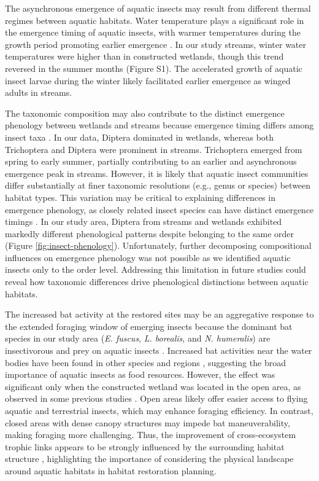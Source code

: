 \documentclass[11pt, class=article, crop=false]{standalone}
\begin{document}
The asynchronous emergence of aquatic insects may result from different thermal regimes between aquatic habitats.
Water temperature plays a significant role in the emergence timing of aquatic insects, with warmer temperatures during the growth period promoting earlier emergence \citep{woods_phenology_2022}.
In our study streams, winter water temperatures were higher than in constructed wetlands, though this trend reversed in the summer months (Figure S1).
The accelerated growth of aquatic insect larvae during the winter likely facilitated earlier emergence as winged adults in streams.

The taxonomic composition may also contribute to the distinct emergence phenology between wetlands and streams because emergence timing differs among insect taxa \citep{terui_species-specific_2017, moore_spawning_2010}.
In our data, Diptera dominated in wetlands, whereas both Trichoptera and Diptera were prominent in streams.
Trichoptera emerged from spring to early summer, partially contributing to an earlier and asynchronous emergence peak in streams.
However, it is likely that aquatic insect communities differ substantially at finer taxonomic resolutions (e.g., genus or species) between habitat types.
This variation may be critical to explaining differences in emergence phenology, as closely related insect species can have distinct emergence timings \citep{moore_spawning_2010}.
In our study area, Diptera from streams and wetlands exhibited markedly different phenological patterns despite belonging to the same order (Figure \ref{fig:insect-phenology}).
Unfortunately, further decomposing compositional influences on emergence phenology was not possible as we identified aquatic insects only to the order level.
Addressing this limitation in future studies could reveal how taxonomic differences drive phenological distinctions between aquatic habitats.

The increased bat activity at the restored sites may be an aggregative response to the extended foraging window of emerging insects because the dominant bat species in our study area (\textit{E. fuscus}, \textit{L. borealis}, and \textit{N. humeralis}) are insectivorous and prey on aquatic insects \citep{whitaker_food_1992, clare_species_2009, agosta_habitat_2002}.
Increased bat activities near the water bodies have been found in other species and regions \citep{akasaka_influence_2009, stahlschmidt_constructed_2012, sirami_artificial_2013}, suggesting the broad importance of aquatic insects as food resources.
However, the effect was significant only when the constructed wetland was located in the open area, as observed in some previous studies \citep{stahlschmidt_constructed_2012, sirami_artificial_2013}.
Open areas likely offer easier access to flying aquatic and terrestrial insects, which may enhance foraging efficiency.
In contrast, closed areas with dense canopy structures may impede bat maneuverability, making foraging more challenging.
Thus, the improvement of cross-ecosystem trophic links appears to be strongly influenced by the surrounding habitat structure \citep{marczak_meta-analysis_2007}, highlighting the importance of considering the physical landscape around aquatic habitats in habitat restoration planning.
\end{document}
